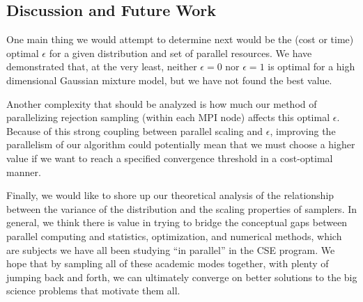 \documentclass{article}
\begin{document}
\subsection{Discussion and Future Work}

One main thing we would attempt to determine next would be the (cost or time)
optimal $\epsilon$ for a given distribution and set of parallel resources.
We have demonstrated that, at the very least, neither $\epsilon=0$ nor
$\epsilon=1$ is optimal for a high dimensional Gaussian mixture model, but
we have not found the best value.

Another complexity that should be analyzed is how much our method of
parallelizing rejection sampling (within each MPI node) affects this optimal
$\epsilon$. Because of this strong coupling between parallel scaling and
$\epsilon$, improving the parallelism of our algorithm could potentially
mean that we must choose a higher value if we want to reach a specified
convergence threshold in a cost-optimal manner.

Finally, we would like to shore up our theoretical analysis of the relationship
between the variance of the distribution and the scaling properties of
samplers. In general, we think there is value in trying to bridge the
conceptual gaps between parallel computing and statistics, optimization, and
numerical methods, which are subjects we have all been studying ``in parallel''
in the CSE program. We hope that by sampling all of these academic modes
together, with plenty of jumping back and forth, we can ultimately converge on
better solutions to the big science problems that motivate them all.

\small


\end{document}

